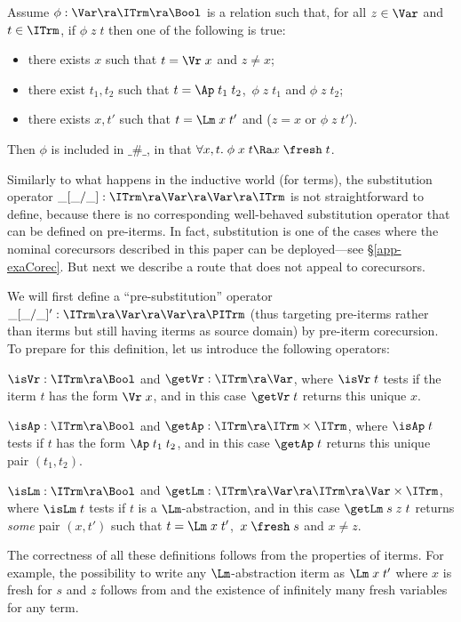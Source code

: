  \begin{prop} \rm 
	\label{prop-coind-fresh}
	Assume $\phi : \Var \ra \ITrm \ra \Bool$ is a relation such that, for all $z\in\Var$ and $t\in\ITrm$, if $\phi\;z\;t$ then one of the following is true: 
	\begin{itemize}
		\item there exists $x$ such that $t=\Vr\;x$ and $z\not=x$;
		\item there exist $t_1,t_2$ such that $t= \Ap\;t_1\;t_2$, 
		\,$\phi\;z\;t_1$ and $\phi\;z\;t_2$; 
		\item there exists $x,t'$ such that $t= \Lm\;x\;t'$ 
		and ($z = x$ or $\phi\;z\;t'$).
	\end{itemize} 
	
	Then $\phi$ is included in $\_\#\_$, in that 
	$\forall x,t.\;\phi\;x\;t \Ra x \;\fresh\;t$.
\end{prop}
 
 
 \medskip
Similarly to what happens in the inductive world (for terms), the substitution operator 
 $\_[\_/\_] : \ITrm \ra \Var \ra \Var \ra \ITrm$ is not straightforward to define, because there is no corresponding well-behaved substitution operator that can be defined on pre-iterms. In fact, substitution is one of the cases where the nominal corecursors described in this paper can be deployed---see \S\ref{app-exaCorec}.  But next we describe a route that does not appeal to corecursors. 
 
 We will first define a ``pre-substitution'' operator $\_[\_/\_]' : \ITrm \ra \Var \ra \Var \ra \PITrm$ (thus targeting pre-iterms rather than iterms but still having iterms as source domain) by pre-iterm corecursion. To prepare for this definition, let us introduce the following operators:
 \begin{myitem}
 	\item $\isVr : \ITrm \ra \Bool$ and $\getVr : \ITrm \ra \Var$, where  
 	$\isVr\;t$ tests if the iterm $t$ has the form $\Vr\;x$, and in this case $\getVr\;t$ returns this unique $x$.
 	\item $\isAp : \ITrm \ra \Bool$ and $\getAp : \ITrm \ra \ITrm \times \ITrm$, where 
 	$\isAp\;t$ tests if $t$ has the form $\Ap\;t_1\;t_2$, and in this case $\getAp\;t$ returns this unique pair $(t_1,t_2)$.
 	\item $\isLm : \ITrm \ra \Bool$ and $\getLm : \ITrm \ra \Var \ra \ITrm \ra \Var \times \ITrm$, where 
 	$\isLm\;t$ tests if $t$ is a $\Lm$-abstraction, and in this case $\getLm\;s\;z\;t$ returns \emph{some} pair $(x,t')$ such that $t = \Lm\;x\;t'$, \,$x\;\fresh\;s$
 	and $x\not= z$. 
 \end{myitem}
 The correctness of all these definitions follows from the properties of iterms. For example, the possibility to write any $\Lm$-abstraction iterm as $\Lm\;x\;t'$ where $x$ is fresh for $s$ and $z$ follows from \SwBvr{} and the existence of infinitely many fresh variables for any term. 
 
